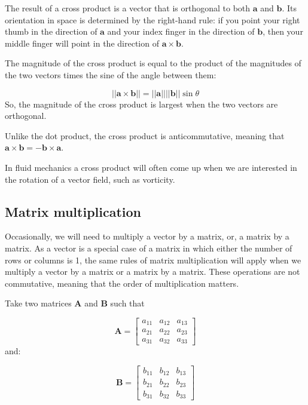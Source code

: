\documentclass[12pt]{article}
\numberwithin{equation}{section}
\numberwithin{figure}{section}
\numberwithin{table}{section}
\begin{document}
The result of a cross product is a vector that is orthogonal to both $\mathbf{a}$
and $\mathbf{b}$.
Its orientation in space is determined by the right-hand rule:
if you point your right thumb in the direction of $\mathbf{a}$ and your index
finger in the direction of $\mathbf{b}$, then your middle finger will point in
the direction of $\mathbf{a} \times \mathbf{b}$.

The magnitude of the cross product is equal to the product of the magnitudes of
the two vectors times the sine of the angle between them:

\begin{equation}
  ||\mathbf{a} \times \mathbf{b}|| = ||\mathbf{a}|| ||\mathbf{b}|| \sin{\theta}
  \label{eq:cross_product_magnitude}
\end{equation}
So, the magnitude of the cross product is largest when the two vectors are
orthogonal.

Unlike the dot product, the cross product is anticommutative, meaning that
$\mathbf{a} \times \mathbf{b} = -\mathbf{b} \times \mathbf{a}$.

In fluid mechanics a cross product will often come up when we are interested in
the rotation of a vector field, such as vorticity.

\subsection{Matrix multiplication}

Occasionally, we will need to multiply a vector by a matrix, or, a matrix by a
matrix.
As a vector is a special case of a matrix in which either the number of rows or
columns is 1, the same rules of matrix multiplication will apply when we
multiply a vector by a matrix or a matrix by a matrix.
These operations are not commutative, meaning that the order of multiplication
matters.

Take two matrices $\mathbf{A}$ and $\mathbf{B}$ such that

\begin{equation}
  \mathbf{A} =
  \begin{bmatrix}
    a_{11} & a_{12} & a_{13} \\
    a_{21} & a_{22} & a_{23} \\
    a_{31} & a_{32} & a_{33}
  \end{bmatrix}
\end{equation}
and:

\begin{equation}
  \mathbf{B} =
  \begin{bmatrix}
    b_{11} & b_{12} & b_{13} \\
    b_{21} & b_{22} & b_{23} \\
    b_{31} & b_{32} & b_{33}
  \end{bmatrix}
\end{equation}
\end{document}
